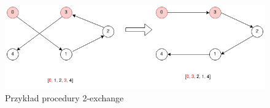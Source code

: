 \begin{figure}[h!]
      \centering
      \includegraphics[width=\textwidth]{chapters/literature/img/2exdrawio.png}
      \caption{Przykład procedury 2-exchange}
      \label{fig:2exchange}
\end{figure}
